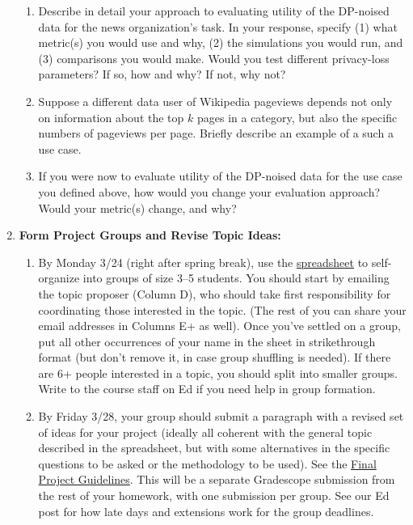\documentclass[11pt]{article}
\begin{document}
\begin{enumerate}[leftmargin=*]
\begin{enumerate}
    \item Describe in detail your approach to evaluating utility of the DP-noised data for the news organization’s task. In your response, specify (1) what metric(s) you would use and why, (2) the simulations you would run, and (3) comparisons you would make. Would you test different privacy-loss parameters? If so, how and why? If not, why not?

    \item Suppose a different data user of Wikipedia pageviews depends not only on information about the top $k$ pages in a category, but also the specific numbers of pageviews per page. Briefly describe an example of a such a use case.

    \item If you were now to evaluate utility of the DP-noised data for the use case you defined above, how would you change your evaluation approach? Would your metric(s) change, and why?
\end{enumerate}

\item \textbf{Form Project Groups and Revise Topic Ideas:}

\begin{enumerate}
\item By Monday 3/24 (right after spring break), use the \href{https://docs.google.com/spreadsheets/d/1gxPtxZU835YJ_yZbDQtneGnusvXHWax4sDi-fodu2wA/edit?gid=0#gid=0}{spreadsheet} to self-organize into groups of size 3--5 students.  You should start by emailing the topic proposer (Column D), who should take first responsibility for coordinating those interested in the topic. (The rest of you can share your email addresses in Columns E+ as well).  Once you've settled on a group, put all other occurrences of your name in the sheet in strikethrough format (but don't remove it, in case group shuffling is needed).  If there are 6+ people interested in a topic, you should split into smaller groups.  Write to the course staff on Ed if you need help in group formation.  

\item By Friday 3/28, your group should submit a paragraph with a revised set of ideas for your project (ideally all coherent with the general topic described in the spreadsheet, but with some alternatives in the specific questions to be asked or the methodology to be used).
See the \href{https://opendp.github.io/cs208/spring2025/files/final_project_guidelines.pdf}{Final Project Guidelines}.
This will be a separate Gradescope submission from the rest of your homework, with one submission per group. See our Ed post for how late days and extensions work for the group deadlines.
\end{enumerate}


\end{enumerate}
\end{document}
